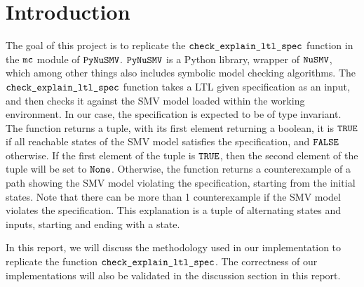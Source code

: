 \section{Introduction}

The goal of this project is to replicate the $\verb|check_explain_ltl_spec|$ function in the $\verb|mc|$ module of $\verb|PyNuSMV|$. $\verb|PyNuSMV|$ is a Python library, wrapper of $\verb|NuSMV|$, which among other things also includes symbolic model checking algorithms. The $\verb|check_explain_ltl_spec|$ function takes a LTL given specification as an input, and then checks it against the SMV model loaded within the working environment. In our case, the specification is expected to be of type invariant. The function returns a tuple, with its first element returning a boolean, it is $\verb|TRUE|$ if all reachable states of the SMV model satisfies the specification, and $\verb|FALSE|$ otherwise. If the first element of the tuple is $\verb|TRUE|$, then the second element of the tuple will be set to $\verb|None|$. Otherwise, the function returns a counterexample of a path showing the SMV model violating the specification, starting from the initial states. Note that there can be more than 1 counterexample if the SMV model violates the specification. This explanation is a tuple of alternating states and inputs, starting and ending with a state.

\medskip

In this report, we will discuss the methodology used in our implementation to replicate the function $\verb|check_explain_ltl_spec|$. The correctness of our implementations will also be validated in the discussion section in this report.